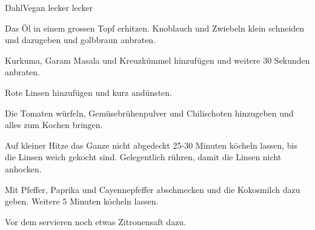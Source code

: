 
\begin{recipe}[]{Dahl}{Vegan lecker lecker}{}



\step
Das \"Ol in einem grossen Topf erhitzen. Knoblauch und Zwiebeln klein schneiden und dazugeben und golbbraun anbraten.

\step
Kurkuma, Garam Masala und Kreuzk\"ummel hinzuf\"ugen und weitere 30 Sekunden anbraten.

\step
Rote Linsen hinzuf\"ugen und kurz and\"unsten.

\step
Die Tomaten w\"urfeln, Gem\"usebr\"uhenpulver und Chilischoten hinzugeben und alles zum Kochen bringen.


\step
Auf kleiner Hitze das Ganze nicht abgedeckt 25-30 Minuten k\"ocheln lassen, bis die Linsen weich gekocht sind.
Gelegentlich r\"uhren, damit die Linsen nicht anhocken.

\step
Mit Pfeffer, Paprika und Cayennepfeffer abschmecken und die Kokosmilch dazu geben. Weitere 5 Minuten k\"ocheln lassen.

\step
Vor dem servieren noch etwas Zitronensaft dazu.


\end{recipe}
